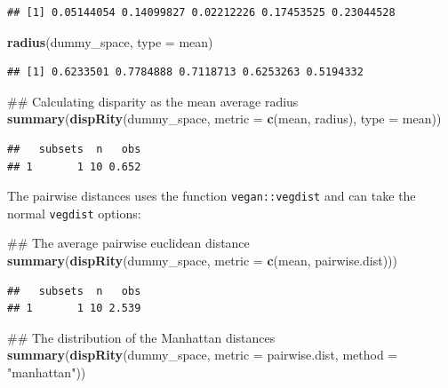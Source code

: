 \documentclass[]{book}
\newenvironment{Shaded}{\begin{snugshade}}{\end{snugshade}}
\newcommand{\KeywordTok}[1]{\textcolor[rgb]{0.13,0.29,0.53}{\textbf{#1}}}
\newcommand{\DataTypeTok}[1]{\textcolor[rgb]{0.13,0.29,0.53}{#1}}
\newcommand{\StringTok}[1]{\textcolor[rgb]{0.31,0.60,0.02}{#1}}
\newcommand{\NormalTok}[1]{#1}
\theoremstyle{definition}
\theoremstyle{definition}
\theoremstyle{definition}
\theoremstyle{remark}
\begin{document}
\begin{verbatim}
## [1] 0.05144054 0.14099827 0.02212226 0.17453525 0.23044528
\end{verbatim}

\begin{Shaded}
\begin{Highlighting}[]
\KeywordTok{radius}\NormalTok{(dummy_space, }\DataTypeTok{type =}\NormalTok{ mean)}
\end{Highlighting}
\end{Shaded}

\begin{verbatim}
## [1] 0.6233501 0.7784888 0.7118713 0.6253263 0.5194332
\end{verbatim}

\begin{Shaded}
\begin{Highlighting}[]
\NormalTok{## Calculating disparity as the mean average radius}
\KeywordTok{summary}\NormalTok{(}\KeywordTok{dispRity}\NormalTok{(dummy_space, }\DataTypeTok{metric =} \KeywordTok{c}\NormalTok{(mean, radius), }\DataTypeTok{type =}\NormalTok{ mean))}
\end{Highlighting}
\end{Shaded}

\begin{verbatim}
##   subsets  n   obs
## 1       1 10 0.652
\end{verbatim}

The pairwise distances uses the function \texttt{vegan::vegdist} and can
take the normal \texttt{vegdist} options:

\begin{Shaded}
\begin{Highlighting}[]
\NormalTok{## The average pairwise euclidean distance}
\KeywordTok{summary}\NormalTok{(}\KeywordTok{dispRity}\NormalTok{(dummy_space, }\DataTypeTok{metric =} \KeywordTok{c}\NormalTok{(mean, pairwise.dist)))}
\end{Highlighting}
\end{Shaded}

\begin{verbatim}
##   subsets  n   obs
## 1       1 10 2.539
\end{verbatim}

\begin{Shaded}
\begin{Highlighting}[]
\NormalTok{## The distribution of the Manhattan distances}
\KeywordTok{summary}\NormalTok{(}\KeywordTok{dispRity}\NormalTok{(dummy_space, }\DataTypeTok{metric =}\NormalTok{ pairwise.dist, }\DataTypeTok{method =} \StringTok{"manhattan"}\NormalTok{))}
\end{Highlighting}
\end{Shaded}
\end{document}
